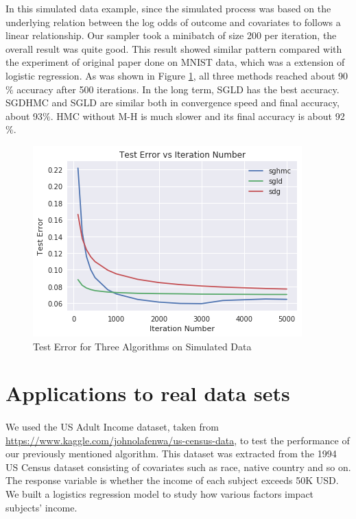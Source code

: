 \documentclass[11pt]{article}
\begin{document}
In this simulated data example, since the simulated process was based on the underlying relation between the log odds of outcome and covariates to follows a linear relationship. Our sampler took a minibatch of size 200 per iteration, the overall result was quite good.
This result showed similar pattern compared with the experiment of original paper done on MNIST data\cite{chen2014stochastic}, which was a extension of logistic regression.
As was shown in Figure \ref{fig:Figure1}, all three methods reached about 90$\%$ accuracy after 500 iterations. In the long term, SGLD has the best accuracy. SGDHMC and SGLD are similar both in convergence speed and final accuracy, about 93$\%$. HMC without M-H is much slower and its final accuracy is about 92$\%$.

\begin{figure}[h!]
\centering
\caption{Test Error for Three Algorithms on Simulated Data}
\label{fig:Figure1}
\includegraphics[scale=0.5]{simu.png}
\end{figure}

\section{Applications to real data sets}
\paragraph{}
We used the US Adult Income dataset, taken from \url{https://www.kaggle.com/johnolafenwa/us-census-data}, to test the performance of our previously mentioned algorithm. This dataset was extracted from the 1994 US Census dataset consisting of covariates such as race, native country and so on. The response variable is whether the income of each subject exceeds 50K USD. We built a logistics regression model to study how various factors impact subjects' income.
\end{document}
